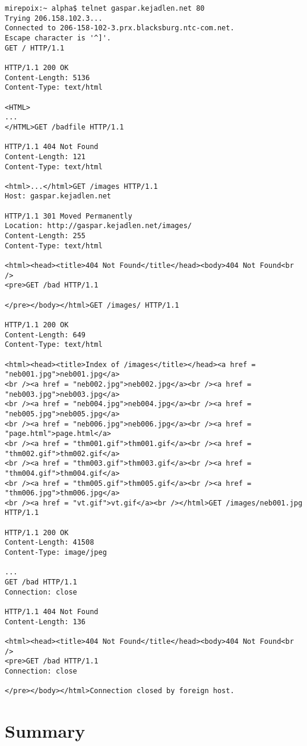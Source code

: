 \documentclass[11pt]{report}
\begin{document}
\begin{verbatim}
mirepoix:~ alpha$ telnet gaspar.kejadlen.net 80
Trying 206.158.102.3...
Connected to 206-158-102-3.prx.blacksburg.ntc-com.net.
Escape character is '^]'.
GET / HTTP/1.1

HTTP/1.1 200 OK
Content-Length: 5136
Content-Type: text/html

<HTML>
...
</HTML>GET /badfile HTTP/1.1

HTTP/1.1 404 Not Found
Content-Length: 121
Content-Type: text/html

<html>...</html>GET /images HTTP/1.1
Host: gaspar.kejadlen.net

HTTP/1.1 301 Moved Permanently
Location: http://gaspar.kejadlen.net/images/
Content-Length: 255
Content-Type: text/html

<html><head><title>404 Not Found</title</head><body>404 Not Found<br />
<pre>GET /bad HTTP/1.1

</pre></body></html>GET /images/ HTTP/1.1

HTTP/1.1 200 OK
Content-Length: 649
Content-Type: text/html

<html><head><title>Index of /images</title></head><a href = "neb001.jpg">neb001.jpg</a>
<br /><a href = "neb002.jpg">neb002.jpg</a><br /><a href = "neb003.jpg">neb003.jpg</a>
<br /><a href = "neb004.jpg">neb004.jpg</a><br /><a href = "neb005.jpg">neb005.jpg</a>
<br /><a href = "neb006.jpg">neb006.jpg</a><br /><a href = "page.html">page.html</a>
<br /><a href = "thm001.gif">thm001.gif</a><br /><a href = "thm002.gif">thm002.gif</a>
<br /><a href = "thm003.gif">thm003.gif</a><br /><a href = "thm004.gif">thm004.gif</a>
<br /><a href = "thm005.gif">thm005.gif</a><br /><a href = "thm006.jpg">thm006.jpg</a>
<br /><a href = "vt.gif">vt.gif</a><br /></html>GET /images/neb001.jpg HTTP/1.1

HTTP/1.1 200 OK
Content-Length: 41508
Content-Type: image/jpeg

...
GET /bad HTTP/1.1
Connection: close

HTTP/1.1 404 Not Found
Content-Length: 136

<html><head><title>404 Not Found</title</head><body>404 Not Found<br />
<pre>GET /bad HTTP/1.1
Connection: close

</pre></body></html>Connection closed by foreign host.
\end{verbatim}

\section{Summary}
\end{document}
